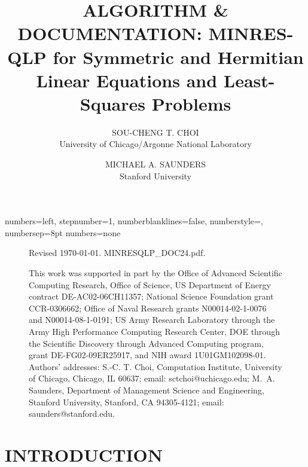 \documentclass{doc_acmtrans2m}
\title{ALGORITHM \& DOCUMENTATION: 
    MINRES-QLP for Symmetric and Hermitian Linear
    Equations and Least-Squares Problems}
\author{SOU-CHENG T. CHOI
     \\ University of Chicago/Argonne National Laboratory
   \and MICHAEL A. SAUNDERS
     \\ Stanford University}
\begin{document}
{numbers=left, stepnumber=1, numberblanklines=false,
numberstyle=\tiny, numbersep=8pt}
{numbers=none}

\lstset{
language=[90]Fortran, %
basicstyle=\small,    %
style=numbers,        %
emptylines=*1,        %
breaklines=true,      %
escapeinside=<>,      %
framesep=0mm,         %
}


\begin{figure}[b]  
Revised \today.  MINRESQLP\_DOC24.pdf. \newline \newline  
 
This work was supported in part by the Office of Advanced Scientific
Computing Research, Office of Science, US Department of Energy
contract DE-AC02-06CH11357; National Science Foundation grant
CCR-0306662; Office of Naval Research grants N00014-02-1-0076 and
N00014-08-1-0191; US Army Research Laboratory through the Army High
Performance Computing Research Center,
DOE through the Scientiﬁc Discovery through Advanced Computing program,
grant DE-FG02-09ER25917, and NIH award 1U01GM102098-01.
\newline
Authors' addresses:
% 
   S.-C. T. Choi, Computation Institute, University of Chicago,
   Chicago, IL 60637; email: sctchoi@uchicago.edu;
%
   M.~A. Saunders, Department of Management Science and Engineering,
   Stanford University, Stanford, CA 94305-4121; email:
   saunders@stanford.edu.
\end{figure}  

\maketitle

\clearpage

\section{INTRODUCTION}
\end{document}
